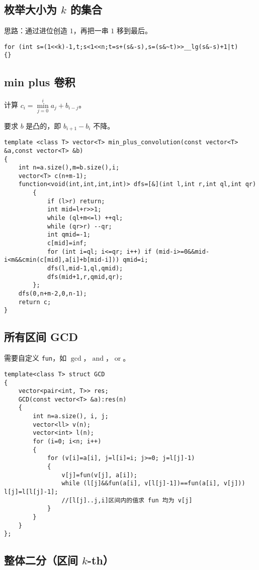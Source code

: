 \documentclass[12pt]{ctexart}
\begin{document}
\subsection{枚举大小为 $k$ 的集合}

思路：通过进位创造 $1$，再把一串 $1$ 移到最后。

\begin{lstlisting}
for (int s=(1<<k)-1,t;s<1<<n;t=s+(s&-s),s=(s&~t)>>__lg(s&-s)+1|t)
{}
\end{lstlisting}
\subsection{min plus 卷积}

计算 $c_i=\min\limits_{j=0}^i a_j+b_{i-j}$。

要求 $b$ 是凸的，即 $b_{i+1}-b_i$ 不降。

\begin{lstlisting}
template <class T> vector<T> min_plus_convolution(const vector<T> &a,const vector<T> &b)
{
	int n=a.size(),m=b.size(),i;
	vector<T> c(n+m-1);
	function<void(int,int,int,int)> dfs=[&](int l,int r,int ql,int qr)
		{
			if (l>r) return;
			int mid=l+r>>1;
			while (ql+m<=l) ++ql;
			while (qr>r) --qr;
			int qmid=-1;
			c[mid]=inf;
			for (int i=ql; i<=qr; i++) if (mid-i>=0&&mid-i<m&&cmin(c[mid],a[i]+b[mid-i])) qmid=i;
			dfs(l,mid-1,ql,qmid);
			dfs(mid+1,r,qmid,qr);
		};
	dfs(0,n+m-2,0,n-1);
	return c;
}

\end{lstlisting}

\subsection{所有区间 GCD}

需要自定义 \verb|fun|，如 $\gcd$，$\operatorname{and}$，$\operatorname{or}$。

\begin{lstlisting}
template<class T> struct GCD
{
	vector<pair<int, T>> res;
	GCD(const vector<T> &a):res(n)
	{
		int n=a.size(), i, j;
		vector<ll> v(n);
		vector<int> l(n);
		for (i=0; i<n; i++)
		{
			for (v[i]=a[i], j=l[i]=i; j>=0; j=l[j]-1)
			{
				v[j]=fun(v[j], a[i]);
				while (l[j]&&fun(a[i], v[l[j]-1])==fun(a[i], v[j])) l[j]=l[l[j]-1];
				//[l[j]..j,i]区间内的值求 fun 均为 v[j]
			}
		}
	}
};
\end{lstlisting}
\subsection{整体二分（区间 $k$-th）}
\end{document}
